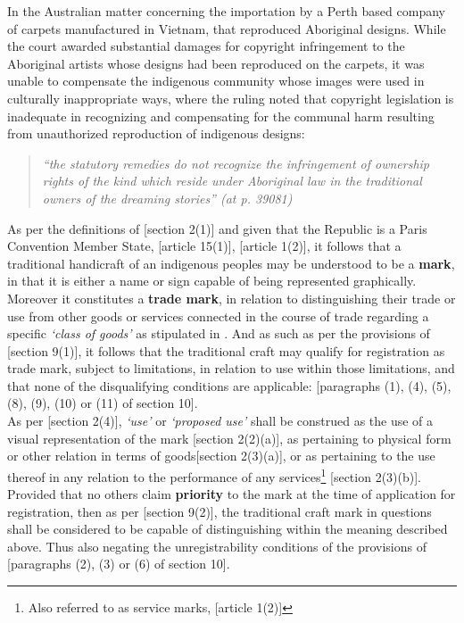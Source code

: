 \documentclass[11pt]{article}
\begin{document}
In the Australian matter \cite{aus95_milpurrurru_v_indofurn} concerning the
importation by a Perth based company of carpets manufactured in Vietnam, that
reproduced Aboriginal designs. While the court awarded substantial damages for
copyright infringement to the Aboriginal artists whose designs had been
reproduced on the carpets, it was unable to compensate the indigenous community
whose images were used in culturally inappropriate ways, where the ruling noted
that copyright legislation is inadequate in recognizing and compensating for the
communal harm resulting from unauthorized reproduction of indigenous designs:
\begin{quote}
\textit{``the statutory remedies do not recognize the infringement of ownership rights of the kind which reside under Aboriginal law in the traditional owners of the dreaming stories'' (at p. 39081)}
\end{quote}
As per the definitions of [section 2(1)]\cite{rsa93_tm_act} and given that the
Republic is a Paris Convention Member State, [article 15(1)]\cite{wto17_trips},
[article 1(2)]\cite{wipo83_paris_conve_protect_ip}, it follows that a traditional
handicraft of an indigenous peoples may be understood to be a \textbf{mark}, in that it
is either a name or sign capable of being represented graphically. Moreover it
constitutes a \textbf{trade mark}, in relation to distinguishing their trade or use
from other goods or services connected in the course of trade regarding a
specific \emph{`class of goods'} as stipulated in \cite{wipo57_ncl}. And as such as per
the provisions of [section 9(1)]\cite{rsa93_tm_act}, it follows that the
traditional craft may qualify for registration as trade mark, subject to
limitations, in relation to use within those limitations, and that none of the
disqualifying conditions are applicable: [paragraphs (1), (4), (5), (8),
(9), (10) or (11) of section 10]\cite{rsa93_tm_act}.\\

As per [section 2(4)]\cite{rsa93_tm_act}, \emph{`use'} or \emph{`proposed use'} shall be
construed as the use of a visual representation of the mark [section
2(2)(a)]\cite{rsa93_tm_act}, as pertaining to physical form or other relation in
terms of goods[section 2(3)(a)]\cite{rsa93_tm_act}, or as pertaining to the use
thereof in any relation to the performance of any services\footnote{Also referred to
as service marks, [article 1(2)]\cite{wipo83_paris_conve_protect_ip}} [section
2(3)(b)]\cite{rsa93_tm_act}. Provided that no others claim \textbf{priority} to the mark
at the time of application for registration, then as per [section
9(2)]\cite{rsa93_tm_act}, the traditional craft mark in questions shall be
considered to be capable of distinguishing within the meaning described above.
Thus also negating the unregistrability conditions of the provisions of
[paragraphs (2), (3) or (6) of section 10]\cite{rsa93_tm_act}.\\
\end{document}
